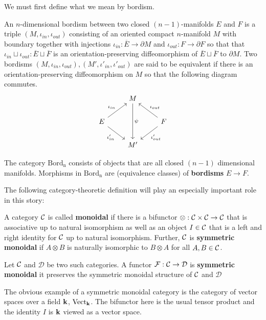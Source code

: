 	We must first define what we mean by bordism.
	\begin{defn}[Bordism]
		An $n$-dimensional bordism between two closed $(n-1)$-manifolds $E$ and $F$ is a triple $(M, \iota_{in},\iota_{out})$ consisting of an oriented compact $n$-manifold $M$ with boundary together with injections $\iota_{in}: \overline E \to \partial M$ and $\iota_{out}: F \to \partial F$ so that that $\iota_{in} \sqcup \iota_{out}: \overline E \sqcup \overline F$ is an orientation-preserving diffeomorphism of $\overline E \sqcup \overline F$ to $\partial M$. Two bordisms $(M, \iota_{in}, \iota_{out}), (M', \iota'_{in}, \iota'_{out})$ are said to be equivalent if there is an orientation-preserving diffeomorphism on $M$ so that the following diagram commutes.
		\[
			\begin{tikzcd}
				& M\arrow[dd,"\psi"] &\\
				E\arrow[ur,"\iota_{in}"]\arrow[dr,swap,"\iota'_{in}"] & & \arrow[ul,swap,"\iota_{out}"]\arrow[dl,"\iota'_{out}"] F\\
				& M' &
			\end{tikzcd}
		\]
	\end{defn}
	\begin{defn}
		The category $\mathrm{Bord_n}$ consists of objects that are all closed $(n-1)$ dimensional manifolds. Morphisms in $\mathrm{Bord_n}$ are (equivalence classes) of \textbf{bordisms} $E \to F$. 
	\end{defn}
	
	The following category-theoretic definition will play an especially important role in this story:
	\begin{defn}
		A category $\mathcal{C}$ is called \textbf{monoidal} if there is a bifunctor $\otimes: \mathcal{C} \times \mathcal{C} \to \mathcal{C}$ that is associative up to natural isomorphism as well as an object $I \in \mathcal{C}$ that is a left and right identity for $\mathcal{C}$ up to natural isomorphism. Further, $\mathcal{C}$ is \textbf{symmetric monoidal} if $A \otimes B$ is naturally isomorphic to $B \otimes A$ for all $A, B \in \mathcal{C}$.
	\end{defn}
	
	\noindent Let $\mathcal{C}$ and $\mathcal D$ be two such categories. A functor $\mathcal F: \mathcal{C} \to \mathcal D$ is \textbf{symmetric monoidal} it preserves the symmetric monoidal structure of $\mathcal{C}$ and $\mathcal D$ 
	
	\begin{eg}
		The obvious example of a symmetric monoidal category is the category of vector spaces over a field $\mathbf{k}$, $\mathrm{Vect}_{\mathbf{k}}$. The bifunctor here is the usual tensor product and the identity $I$ is $\mathbf{k}$ viewed as a vector space. 
	\end{eg}
	
